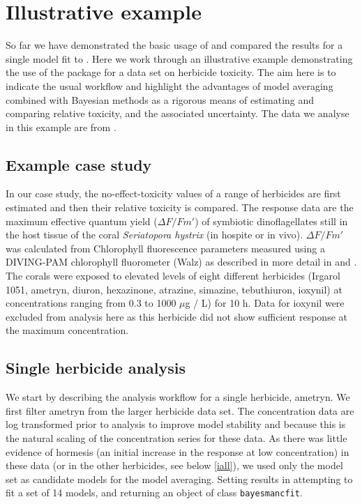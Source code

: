 \documentclass[
  shortnames]{jss}
\begin{document}
\section[Illustrative example]{Illustrative example}\label{iexample}

So far we have demonstrated the basic usage of  and compared the results for a single model fit to . Here we work through an illustrative example demonstrating the use of the package for a data set on herbicide toxicity. The aim here is to indicate the usual workflow and highlight the advantages of model averaging combined with Bayesian methods as a rigorous means of estimating and comparing relative toxicity, and the associated uncertainty. The data we analyse in this example are from \citet{jones2003meps}.

\hypertarget{example-case-study}{%
\subsection{Example case study}\label{example-case-study}}

In our case study, the no-effect-toxicity values of a range of herbicides are first estimated and then their relative toxicity is compared. The response data are the maximum effective quantum yield (\({\Delta F / Fm'}\)) of symbiotic dinoflagellates still in the host tissue of the coral \emph{Seriatopora hystrix} (in hospite or in vivo). \({\Delta F / Fm'}\) was calculated from Chlorophyll fluorescence parameters measured using a DIVING-PAM chlorophyll fluorometer (Walz) as described in more detail in \citet{jones2003meps} and \citet{jones2003effects}. The corals were exposed to elevated levels of eight different herbicides (Irgarol 1051, ametryn, diuron, hexazinone, atrazine, simazine, tebuthiuron, ioxynil) at concentrations ranging from 0.3 to 1000 \(\mu\)g / L) for 10 h. Data for ioxynil were excluded from analysis here as this herbicide did not show sufficient response at the maximum concentration.

\newpage

\subsection[Single herbicide]{Single herbicide analysis}\label{isingle}

We start by describing the analysis workflow for a single herbicide, ametryn. We first filter ametryn from the larger herbicide data set. The concentration data are log transformed prior to analysis to improve model stability and because this is the natural scaling of the concentration series for these data. As there was little evidence of hormesis (an initial increase in the response at low concentration) in these data (or in the other herbicides, see below \ref{iall}), we used only the  model set as candidate models for the model averaging. Setting  results in  attempting to fit a set of 14 models, and returning an object of class \texttt{bayesmancfit}.
\end{document}
